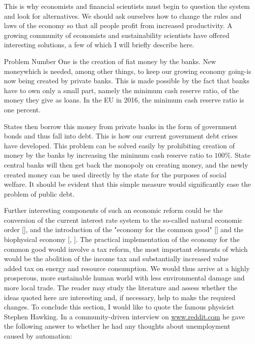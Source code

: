\documentclass[10pt]{book}
\begin{document}
This is why economists and financial scientists must begin to question the system and look for alternatives. We should ask ourselves how to change the rules and laws of the economy so that all people profit from increased productivity. A growing community of economists and sustainability scientists have offered interesting solutions, a few of which I will briefly describe here.

Problem Number One is the creation of fiat money by the banks. New moneywhich is needed, among other things, to keep our growing economy going-is now being created by private banks. This is made possible by the fact that banks have to own only a small part, namely the minimum cash reserve ratio, of the money they give as loans. In the EU in 2016, the minimum cash reserve ratio is one percent.

States then borrow this money from private banks in the form of government bonds and thus fall into debt. This is how our current government debt crises have developed. This problem can be solved easily by prohibiting creation of money by the banks by increasing the minimum cash reserve ratio to $100 \%$. State central banks will then get back the monopoly on creating money, and the newly created money can be used directly by the state for the purposes of social welfare. It should be evident that this simple measure would significantly ease the problem of public debt.

Further interesting components of such an economic reform could be the conversion of the current interest rate system to the so-called natural economic order [\cite{gesell1958natural}], and the introduction of the "economy for the common good" [\cite{felber2014gemeinwohl}] and the biophysical economy [\cite{grahl2009loch}, \cite{kummel2011secondlaw}]. The practical implementation of the economy for the common good would involve a tax reform, the most important elements of which would be the abolition of the income tax and substantially increased value\\
added tax on energy and resource consumption. We would thus arrive at a highly prosperous, more sustainable human world with less environmental damage and more local trade. The reader may study the literature and assess whether the ideas quoted here are interesting and, if necessary, help to make the required changes.
To conclude this section, I would like to quote the famous physicist Stephen Hawking. In a community-driven interview on \href{http://www.reddit.com}{www.reddit.com} he gave the following answer to whether he had any thoughts about unemployment caused by automation:
\end{document}

